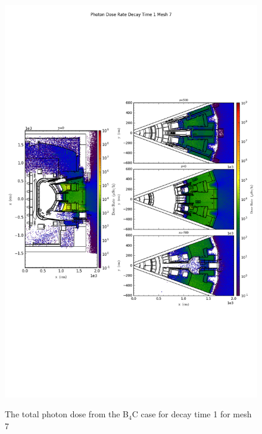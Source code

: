 \begin{figure}[ht!]
\centering
\includegraphics[trim={0cm 9cm 0cm 10cm},clip,scale=0.75]{../plots/final_model_nob4c/Photon_Dose_Rate_Decay_Time_1_Mesh_7.png}
\label{fig:photons_dc1_no4bc_m7_flux}
\caption{The total photon dose from the B$_4$C case for decay time 1 for mesh 7}
\end{figure}
